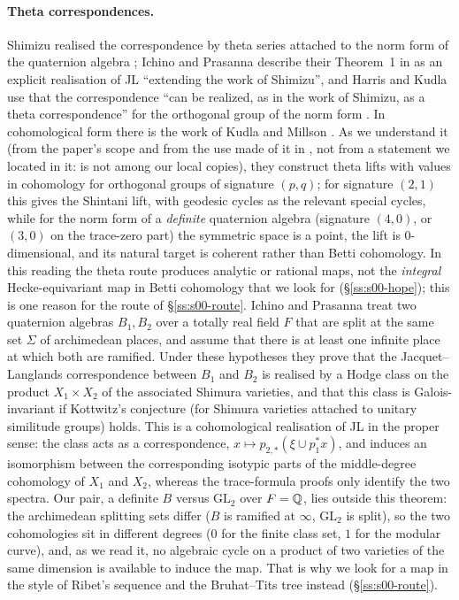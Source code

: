 \paragraph{Theta correspondences.} Shimizu realised the correspondence by theta series attached to the norm form of the
quaternion algebra \cite{Shz72}; Ichino and Prasanna describe their Theorem~1 in \cite{IP16} as an explicit realisation of JL
``extending the work of Shimizu'', and Harris and Kudla use that the correspondence ``can be realized, as in the work of Shimizu,
as a theta correspondence'' for the orthogonal group of the norm form \cite[pp.~607--608]{HK91}. In cohomological form there is the work of Kudla and Millson \cite{KM86}. As
we understand it (from the paper's scope and from the use made of it in \cite[\S1.2.3]{IP23}, not from a statement we located in it: \cite{KM86} is not among our local copies), they construct theta lifts with values in cohomology for orthogonal groups of signature $(p,q)$; for signature $(2,1)$ this gives the Shintani lift, with geodesic cycles as the relevant special cycles, while for the norm
form of a \emph{definite} quaternion algebra (signature $(4,0)$, or $(3,0)$ on the trace-zero part) the symmetric space is a
point, the lift is $0$-dimensional, and its natural target is coherent rather than Betti cohomology. In this reading the theta
route produces analytic or rational maps, not the \emph{integral} Hecke-equivariant map in Betti cohomology that we look for
(\S\ref{ss:s00-hope}); this is one reason for the route of \S\ref{ss:s00-route}. Ichino and Prasanna \cite[\S1, Thm.~1, pp.~4--5]{IP23} treat two quaternion algebras $B_1,B_2$ over a totally real field $F$
that are split at the same set $\Sigma$ of archimedean places, and assume that there is at least one infinite place at which
both are ramified. Under these hypotheses they prove that the Jacquet--Langlands correspondence between $B_1$ and $B_2$ is
realised by a Hodge class on the product $X_1\times X_2$ of the associated Shimura varieties, and that this class is
Galois-invariant if Kottwitz's conjecture (for Shimura varieties attached to unitary similitude groups) holds. This is a
cohomological realisation of JL in the proper sense: the class acts as a correspondence, $x\mapsto p_{2,*}(\xi\cup p_1^*x)$,
and induces an isomorphism between the corresponding isotypic parts of the middle-degree cohomology of $X_1$ and $X_2$,
whereas the trace-formula proofs only identify the two spectra. Our pair, a definite $B$ versus $\mathrm{GL}_2$ over $F=\mathbb{Q}$,
lies outside this theorem: the archimedean splitting sets differ ($B$ is ramified at $\infty$, $\mathrm{GL}_2$ is split), so
the two cohomologies sit in different degrees ($0$ for the finite class set, $1$ for the modular curve), and, as we read it,
no algebraic cycle on a product of two varieties of the same dimension is available to induce the map. That is why we look for
a map in the style of Ribet's sequence and the Bruhat--Tits tree instead (\S\ref{ss:s00-route}).

